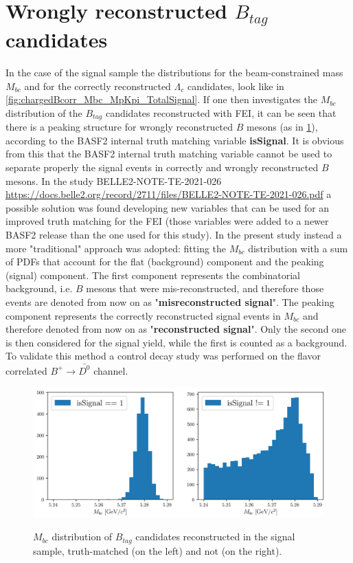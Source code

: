 \section{Wrongly reconstructed $B_{tag}$ candidates}\label{wronglyBtag}

In the case of the signal sample the distributions for the beam-constrained mass $M_{bc}$ and for the correctly reconstructed $\Lambda_c$ candidates, look
like in \cref{fig:chargedBcorr_Mbc_MpKpi_TotalSignal}. If one then investigates the $M_{bc}$ distribution of the $B_{tag}$ candidates reconstructed with 
FEI, it can be seen that there is a peaking structure for wrongly reconstructed $B$ 
mesons (as in \cref{fig:wrongly_recoB}), according to the BASF2 internal truth matching variable \textbf{isSignal}.
It is obvious from this that the BASF2 internal truth matching variable cannot be used to separate properly the signal events in correctly and wrongly reconstructed $B$ mesons. In the study  BELLE2-NOTE-TE-2021-026 \url{https://docs.belle2.org/record/2711/files/BELLE2-NOTE-TE-2021-026.pdf} a possible solution was found developing new variables that can be used for an improved truth matching for the FEI (those variables were added to a newer BASF2 release than the one used for this study). In the present study instead a more "traditional" approach was adopted: fitting the $M_{bc}$ distribution with a sum of PDFs that account for the flat (background) component and the peaking (signal) component. The first component represents the combinatorial background, i.e. $B$ mesons that were mis-reconstructed, and therefore those events are denoted from now on as    "\textbf{misreconstructed signal}".  
The peaking component represents the correctly reconstructed signal events in $M_{bc}$ and therefore denoted from now on as "\textbf{reconstructed signal}".  Only the second one is then considered for the signal yield, while the first is counted as a background.
To validate this method a control decay study was performed on the flavor correlated $B^+ \rightarrow \bar{D^0}$ channel. 


\begin{figure}[h!]
\centering
{\includegraphics[width=1.\textwidth]{03-Selection/figs/wrongly_recoB.png}}
\caption{$M_{bc}$ distribution of $B_{tag}$ candidates reconstructed in the signal sample, truth-matched (on the left) and not (on the right).}
\label{fig:wrongly_recoB}
\end{figure}


